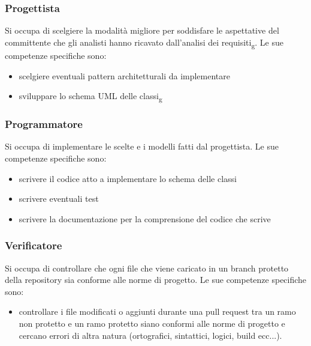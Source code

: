 \subsubsection{Progettista}
Si occupa di scelgiere la modalità migliore per soddisfare le aspettative del committente che gli analisti hanno ricavato dall'analisi dei requisiti\textsubscript{g}. Le sue competenze specifiche sono:
\begin{itemize}
	\item scelgiere eventuali pattern architetturali da implementare
	\item sviluppare lo schema UML delle classi\textsubscript{g}
\end{itemize}

\subsubsection{Programmatore}
Si occupa di implementare le scelte e i modelli fatti dal progettista. Le sue competenze specifiche sono:
\begin{itemize}
	\item scrivere il codice atto a implementare lo schema delle classi
	\item scrivere eventuali test
	\item scrivere la documentazione per la comprensione del codice che scrive
\end{itemize}

\subsubsection{Verificatore}
Si occupa di controllare che ogni file che viene caricato in un branch protetto della repository sia conforme alle norme di progetto. Le sue competenze specifiche sono:
\begin{itemize}
	\item controllare i file modificati o aggiunti durante una pull request tra un ramo non protetto e un ramo protetto siano conformi alle norme di progetto e cercano errori di altra natura (ortografici, sintattici, logici, build ecc...).
\end{itemize}



